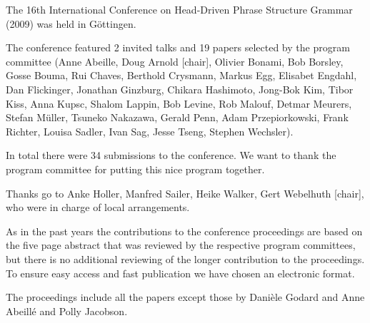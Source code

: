 The 16th International Conference on Head-Driven Phrase Structure Grammar (2009) was held in Göttingen.

The conference featured 2 invited talks and 19 papers selected by the program committee (Anne
Abeille, Doug Arnold [chair], Olivier Bonami, Bob Borsley, Gosse Bouma, Rui Chaves, Berthold
Crysmann, Markus Egg, Elisabet Engdahl, Dan Flickinger, Jonathan Ginzburg, Chikara Hashimoto,
Jong-Bok Kim, Tibor Kiss, Anna Kupsc, Shalom Lappin, Bob Levine, Rob Malouf, Detmar Meurers, Stefan
Müller, Tsuneko Nakazawa, Gerald Penn, Adam Przepiorkowski, Frank Richter, Louisa Sadler, Ivan Sag,
Jesse Tseng, Stephen Wechsler).


In total there were 34  submissions to the conference.
We want to thank the  program committee for putting this nice program together.



Thanks go to Anke Holler, Manfred Sailer, Heike Walker, Gert Webelhuth [chair], who were in charge of local arrangements.


As in the past years the contributions to the conference proceedings are based on the five page abstract
that was reviewed by the respective program committees, but there is no additional reviewing of the
longer contribution to the proceedings.
To ensure easy access and fast publication we have chosen an electronic format.


The proceedings include all the papers except those by Danièle Godard and Anne Abeillé and Polly Jacobson.

